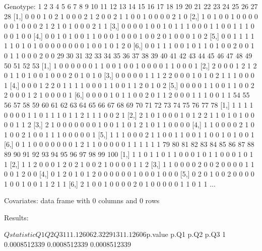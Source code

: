 \documentclass{article}
\begin{document}
\begin{Schunk}
\begin{Soutput}
Genotype:
     1 2 3 4 5 6 7 8 9 10 11 12 13 14 15 16 17 18 19 20 21 22 23 24 25 26 27 28
[1,] 0 0 0 1 0 2 1 0 0  0  2  1  2  0  0  2  1  1  0  0  1  0  0  0  0  2  1  0
[2,] 1 0 1 0 0 1 0 0 0  0  0  0  1  0  0  0  2  1  2  1  0  1  0  0  0  2  1  1
[3,] 0 0 0 0 1 0 0 1 0  1  1  1  0  0  0  1  1  0  0  1  1  1  0  0  0  1  0  0
[4,] 0 0 1 0 1 0 0 1 1  0  0  0  1  0  0  0  1  0  0  2  0  1  0  0  0  1  0  2
[5,] 0 0 1 1 1 1 1 1 0  1  0  1  0  0  0  0  0  0  0  0  1  0  0  1  0  1  2  0
[6,] 0 0 1 1 1 0 0 1 0  1  1  0  1  0  0  2  0  0  1  0  1  1  0  0  0  2  0  0
     29 30 31 32 33 34 35 36 37 38 39 40 41 42 43 44 45 46 47 48 49 50 51 52 53
[1,]  1  0  0  0  0  0  0  1  1  0  0  1  0  0  1  0  0  0  0  1  1  0  0  0  1
[2,]  2  0  0  0  1  2  1  2  0  1  1  0  1  0  0  1  0  0  0  2  0  1  0  1  0
[3,]  0  0  0  0  0  1  1  1  2  2  0  0  0  1  0  1  0  2  1  1  1  0  0  0  1
[4,]  0  0  0  1  2  2  0  1  1  1  1  0  0  0  1  1  0  0  1  1  2  0  1  0  2
[5,]  0  0  0  0  1  1  0  0  1  1  0  0  2  2  0  0  0  1  2  1  0  0  0  0  1
[6,]  0  0  0  0  1  0  1  1  0  0  2  0  1  1  2  0  0  0  1  1  1  0  0  1  1
     54 55 56 57 58 59 60 61 62 63 64 65 66 67 68 69 70 71 72 73 74 75 76 77 78
[1,]  1  1  1  1  0  0  0  0  1  1  0  1  1  1  0  1  1  2  1  1  1  0  0  2  1
[2,]  2  1  0  1  0  0  0  1  0  1  2  2  1  1  0  1  0  1  0  0  0  0  1  1  2
[3,]  2  1  0  0  0  0  0  0  0  1  0  0  1  1  0  1  2  1  0  1  1  0  0  0  0
[4,]  1  1  0  0  0  0  2  1  0  1  0  0  2  1  0  0  1  1  1  0  0  0  0  0  1
[5,]  1  1  1  0  0  0  2  1  1  0  0  1  1  0  0  1  1  0  0  1  0  1  0  0  1
[6,]  0  1  1  0  0  0  0  0  0  0  1  2  1  1  0  0  0  0  0  1  1  1  1  1  1
     79 80 81 82 83 84 85 86 87 88 89 90 91 92 93 94 95 96 97 98 99 100
[1,]  1  1  0  1  1  0  1  1  0  0  0  1  0  1  1  0  0  0  1  0  1   1
[2,]  1  1  2  0  0  0  1  2  0  2  1  0  0  2  1  0  0  0  0  1  1   2
[3,]  1  1  0  0  0  0  2  0  0  2  0  0  0  0  1  1  0  0  1  2  0   0
[4,]  0  1  2  0  1  0  1  2  0  0  0  0  0  0  1  0  0  0  1  0  0   0
[5,]  0  2  0  1  0  0  2  0  0  0  0  1  0  0  1  0  0  1  1  2  1   1
[6,]  2  1  0  0  1  0  0  0  0  2  0  1  0  0  0  0  0  1  1  0  1   1
...

Covariates:
data frame with 0 columns and 0 rows


Results:

$Qstatistic
        Q1       Q2       Q3
1 11.12606 2.322913 11.12606

$p.value
          p.Q1         p.Q2         p.Q3
1 0.0008512339 0.0008512339 0.0008512339
\end{Soutput}
\end{Schunk}
\end{document}
